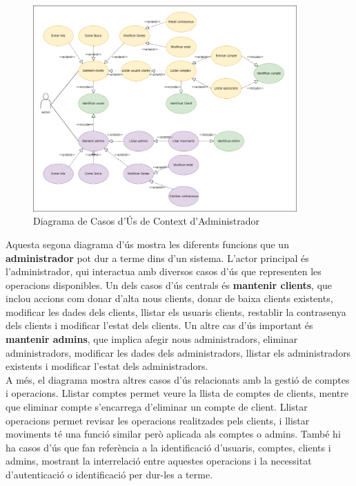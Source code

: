 \documentclass[a4paper,12pt,twoside]{ThesisStyle}
\begin{document}
\clearpage
\begin{figure}[h]
    \centering
    \includegraphics[width=0.9\textwidth]{imatges/diagrama caso de uso admin.png}
    \caption{ Diagrama de Casos d'Ús de Context d'Administrador }
    \label{fig:Diagrama de Casos d'Ús de Context d'Administrador}
\end{figure}


Aquesta segona diagrama d'ús mostra les diferents funcions que un \textbf{administrador} pot dur a terme dins d'un sistema. L'actor principal és l'administrador, qui interactua amb diversos casos d'ús que representen les operacions disponibles. Un dels casos d'ús centrals és \textbf{mantenir clients}, que inclou accions com donar d'alta nous clients, donar de baixa clients existents, modificar les dades dels clients, llistar els usuaris clients, restablir la contrasenya dels clients i modificar l'estat dels clients. Un altre cas d'ús important és \textbf{mantenir admins}, que implica afegir nous administradors, eliminar administradors, modificar les dades dels administradors, llistar els administradors existents i modificar l'estat dels administradors.\\

A més, el diagrama mostra altres casos d'ús relacionats amb la gestió de comptes i operacions. Llistar comptes permet veure la llista de comptes de clients, mentre que eliminar compte s'encarrega d'eliminar un compte de client. Llistar operacions permet revisar les operacions realitzades pels clients, i llistar moviments té una funció similar però aplicada als comptes o admins. També hi ha casos d'ús que fan referència a la identificació d'usuaris, comptes, clients i admins, mostrant la interrelació entre aquestes operacions i la necessitat d'autenticació o identificació per dur-les a terme.
\end{document}
